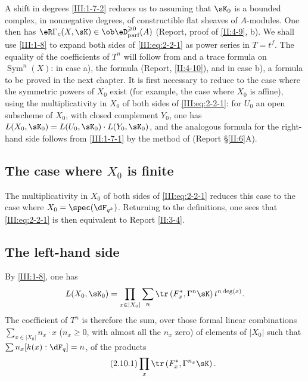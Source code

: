 A shift in degrees \ref{III:1-7-2} reduces us to assuming that $\sK_0$ is a
bounded complex, in nonnegative degrees, of constructible flat sheaves of
$A$-modules. One then has
$\eR\Gamma_c(X,\sK)\in \ob\eD_\text{parf}^{\geqslant 0}(A)$ (Report, proof of
\ref{II:4-9}, b). We shall use \ref{III:1-8} to expand both sides of
\eqref{III:eq:2-2-1} as power series in $T=t^f$. The equality of the
coefficients of $T^n$ will follow from \cite[XVII 5.5.21]{sga4} and a trace
formula on $\operatorname{Sym}^n(X)$: in case a), the formula (Report,
\ref{II:4-10}), and in case b), a formula to be proved in the next chapter.
It is first necessary to reduce to the case where the symmetric powers of
$X_0$ exist (for example, the case where $X_0$ is affine), using the
multiplicativity in $X_0$ of both sides of \eqref{III:eq:2-2-1}: for $U_0$ an
open subscheme of $X_0$, with closed complement $Y_0$, one has
$L(X_0,\sK_0)=L(U_0,\sK_0)\cdot L(Y_0,\sK_0)$, and the analogous formula for
the right-hand side follows from \ref{III:1-7-1} by the method of (Report
\S\ref{II:6}A).






\subsection{The case where $X_0$ is finite}\label{III:2-9}

The multiplicativity in $X_0$ of both sides of \eqref{III:eq:2-2-1} reduces
this case to the case where $X_0=\spec(\dF_{q^k})$. Returning to the
definitions, one sees that \eqref{III:eq:2-2-1} is then equivalent to Report
\ref{II:3-4}.






\subsection{The left-hand side}\label{III:2-10}

By \ref{III:1-8}, one has
\[
  L(X_0,\sK_0) = \prod_{x\in |X_0|} \sum_n \tr\left(F_x^*,\Gamma^n\sK\right) t^{n\deg(x)} \text{.}
\]
The coefficient of $T^n$ is therefore the sum, over those formal linear
combinations $\sum_{x\in |X_0|} n_x\cdot x$ ($n_x\geqslant 0$, with almost
all the $n_x$ zero) of elements of $|X_0|$ such that
$\sum n_x [k(x):\dF_q] = n$, of the products
\begin{equation*}\tag{2.10.1}\label{III:eq:2-10-1}
  \prod_x \tr\left(F_x^*,\Gamma^{n_x} \sK\right) \text{.}
\end{equation*}

